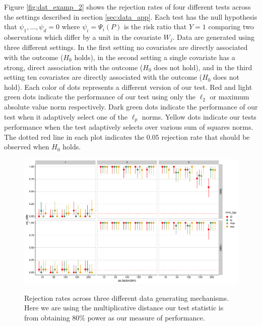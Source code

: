 \documentclass{article}
\begin{document}
Figure \ref{fig:dat_examp_2} shows the rejection rates of four different tests across the settings described in section \ref{sec:data_app}. Each test has the null hypothesis that $\psi_1, \dots, \psi_d = 0$ where $\psi_i = \Psi_i(P)$ is the risk ratio that $Y = 1$ comparing two observations which differ by a unit in the covariate $W_j$. Data are generated using three  different settings.  In the first setting no covariates are directly associated with the outcome ($H_0$ holds), in the second setting a single covariate has a strong, direct association with the outcome ($H_0$ does not hold), and in the third setting ten covariates are directly associated with the outcome ($H_0$ does not hold). Each color of dots represents a different version of our test. Red and light green dots indicate the performance of our test using only the $\ell_2$ or maximum absolute value norm respectively.  Dark green dots indicate the performance of our test when it adaptively select one of the $\ell_p$ norms. Yellow dots indicate our tests performance when the test adaptively selects over various sum of squares norms. The dotted red line in each plot indicates the $0.05$ rejection rate that should be observed when $H_0$ holds. 

\begin{figure}[H]
	\centering
\includegraphics[width = \linewidth]{mag_w_unc_de2.pdf}
\label{fig:dat_examp_2}
	\caption{Rejection rates across three different data generating mechanisms. Here we are using the multiplicative distance our test statistic is from obtaining 80\% power as our measure of performance.}
	\label{fig:magnitude}
\end{figure}
\end{document}
